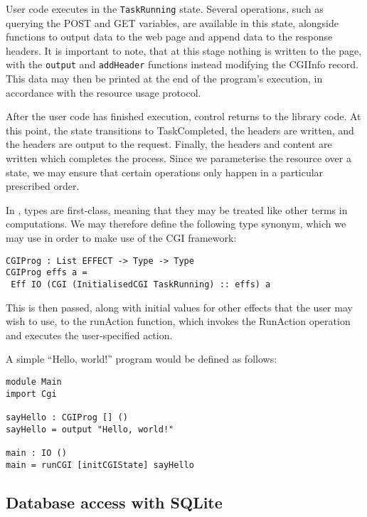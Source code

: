 \documentclass[preprint]{sigplanconf}
\begin{document}
User code executes in the \texttt{TaskRunning} state. Several operations, such as querying the POST and GET variables, are available in this state, alongside functions to output data to the web page and append data to the response headers. It is important to note, that at this stage nothing is written to the page, with the \texttt{output} and \texttt{addHeader} functions instead modifying the CGIInfo record. This data may then be printed at the end of the program's execution, in accordance with the resource usage protocol.

After the user code has finished execution, control returns to the library code. At this point, the state transitions to TaskCompleted, the headers are written, and the headers are output to the request. Finally, the headers and content are written which completes the process. Since we parameterise the resource over a state, we may ensure that certain operations only happen in a particular prescribed order.

In \idris{}, types are first-class, meaning that they may be treated like other terms in computations. We may therefore define the following type synonym, which we may use in order to make use of the CGI framework: 
\begin{Verbatim}
CGIProg : List EFFECT -> Type -> Type
CGIProg effs a = 
 Eff IO (CGI (InitialisedCGI TaskRunning) :: effs) a
\end{Verbatim}
This is then passed, along with initial values for other effects that the user may wish to use, to the runAction function, which invokes the RunAction operation and executes the user-specified action.

A simple ``Hello, world!'' program would be defined as follows:

\begin{Verbatim}
module Main
import Cgi

sayHello : CGIProg [] ()
sayHello = output "Hello, world!"

main : IO ()
main = runCGI [initCGIState] sayHello
\end{Verbatim}

\subsection{Database access with SQLite}
\end{document}
